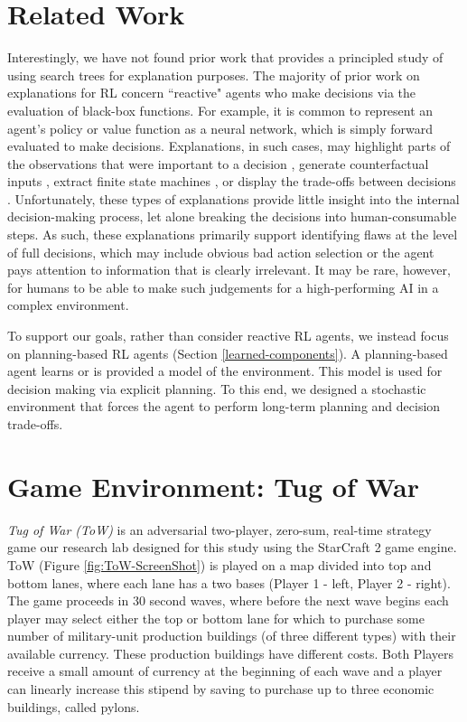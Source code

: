 \documentclass{article}
\begin{document}
\section{Related Work}
Interestingly, we have not found prior work that provides a principled study of using search trees for explanation purposes. The majority of prior work on explanations for RL concern ``reactive" agents who make decisions via the evaluation of black-box functions. For example, it is common to represent an agent's policy or value function as a neural network, which is simply forward evaluated to make decisions. Explanations, in such cases, may highlight parts of the observations that were important to a decision \cite{pmlr-v80-greydanus18a,DBLP:journals/corr/abs-1809-06061,DBLP:journals/corr/abs-1906-02500,gupta2020explain,atrey2020exploratory}, generate counterfactual inputs \cite{olson2019counterfactual}, extract finite state machines \cite{MISCkoul2018learning}, or display the trade-offs between decisions \cite{juozapaitis2019}. Unfortunately, these types of explanations provide little insight into the internal decision-making process, let alone breaking the decisions into human-consumable steps. As such, these explanations primarily support identifying flaws at the level of full decisions, which may include obvious bad action selection or the agent pays attention to information that is clearly irrelevant. It may be rare, however, for humans to be able to make such judgements for a high-performing AI in a complex environment. 

To support our goals, rather than consider reactive RL agents, we instead focus on planning-based RL agents (Section \ref{learned-components}). 
A planning-based agent learns or is provided a model of the environment. This model is used for decision making via explicit planning. To this end, we designed a stochastic environment that forces the agent to perform long-term planning and decision trade-offs. 

\section{Game Environment: Tug of War}
\label{gameRules-information}

\emph{Tug of War (ToW)} is an adversarial two-player, zero-sum, real-time strategy game our research lab designed for this study using the StarCraft 2 game engine. ToW (Figure \ref{fig:ToW-ScreenShot}) is played on a map divided into top and bottom lanes, where each lane has a two bases (Player 1 - left, Player 2 - right). The game proceeds in 30 second waves, where before the next wave begins each player may select either the top or bottom lane for which to purchase some number of military-unit production buildings (of three different types) with their available currency. These production buildings have different costs. Both Players receive a small amount of currency at the beginning of each wave and a player can linearly increase this stipend by saving to purchase up to three economic buildings, called pylons.
\end{document}

